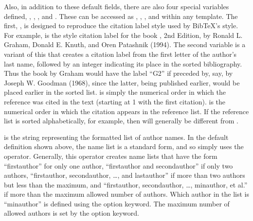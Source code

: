\documentclass[letterpaper,10pt,english]{sphinxmanual}
\begin{document}
Also, in addition to these default fields, there are also four special variables defined, , , , and . These can be accessed as , , , and  within any template. The first, , is designed to reproduce the citation label style used by BibTeX’s  style. For example,  is the \textendash{}style citation label for the book , 2nd Edition, by Ronald L. Graham, Donald E. Knuth, and Oren Patashnik (1994). The second variable  is a variant of this that creates a citation label from the first letter of the author’s last name, followed by an integer indicating its place in the sorted bibliography. Thus the book by Graham  would have the label “G2” if preceded by, say,  by Joseph W. Goodman (1968), since the latter, being published earlier, would be placed earlier in the sorted list.  is simply the numerical order in which the reference was cited in the text (starting at 1 with the first citation).  is the numerical order in which the citation appears in the reference list. If the reference list is sorted alphabetically, for example, then  will generally be different from .

 is the string representing the formatted list of author names. In the default definition shown above, the name list is a standard form, and so simply uses the  operator. Generally, this operator creates name lists that have the form “firstauthor” for only one author, “firstauthor and secondauthor” if only two authors, “firstauthor, secondauthor, …, and lastauthor” if more than two authors but less than the maximum, and “firstauthor, secondauthor, …, minauthor, et al.” if more than the maximum allowed number of authors. Which author in the list is “minauthor” is defined using the  option keyword. The maximum number of allowed authors is set by the  option keyword.
\end{document}
